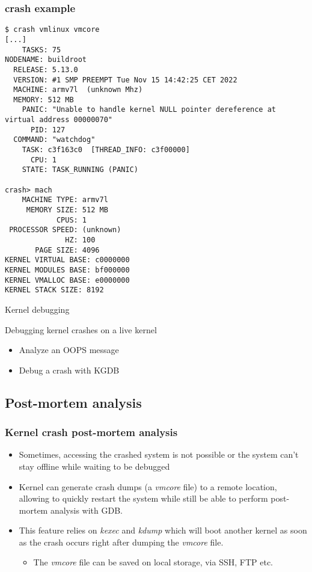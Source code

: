 \begin{frame}[fragile]
  \frametitle{crash example}
  \begin{itemize}
    \begin{block}{}
      \begin{verbatim}
$ crash vmlinux vmcore
[...]
    TASKS: 75
NODENAME: buildroot
  RELEASE: 5.13.0
  VERSION: #1 SMP PREEMPT Tue Nov 15 14:42:25 CET 2022
  MACHINE: armv7l  (unknown Mhz)
  MEMORY: 512 MB
    PANIC: "Unable to handle kernel NULL pointer dereference at virtual address 00000070"
      PID: 127
  COMMAND: "watchdog"
    TASK: c3f163c0  [THREAD_INFO: c3f00000]
      CPU: 1
    STATE: TASK_RUNNING (PANIC)

crash> mach
    MACHINE TYPE: armv7l
     MEMORY SIZE: 512 MB
            CPUS: 1
 PROCESSOR SPEED: (unknown)
              HZ: 100
       PAGE SIZE: 4096
KERNEL VIRTUAL BASE: c0000000
KERNEL MODULES BASE: bf000000
KERNEL VMALLOC BASE: e0000000
KERNEL STACK SIZE: 8192
      \end{verbatim}
    \end{block}
  \end{itemize}
\end{frame}

\setuplabframe
{Kernel debugging}
{
  Debugging kernel crashes on a live kernel
  \begin{itemize}
    \item Analyze an OOPS message
    \item Debug a crash with KGDB
  \end{itemize}
}

\subsection{Post-mortem analysis}

\begin{frame}
  \frametitle{Kernel crash post-mortem analysis}
  \begin{itemize}
    \item Sometimes, accessing the crashed system is not possible or the system
          can't stay offline while waiting to be debugged
    \item Kernel can generate crash dumps (a {\em vmcore} file) to a remote
          location, allowing to quickly restart the system while still
          be able to perform post-mortem analysis with GDB.
    \item This feature relies on {\em kexec} and {\em kdump} which will
          boot another kernel as soon as the crash occurs right after dumping the
          {\em vmcore} file.
    \begin{itemize}
      \item The {\em vmcore} file can be saved on local storage, via SSH, FTP etc.
    \end{itemize}
  \end{itemize}
\end{frame}

